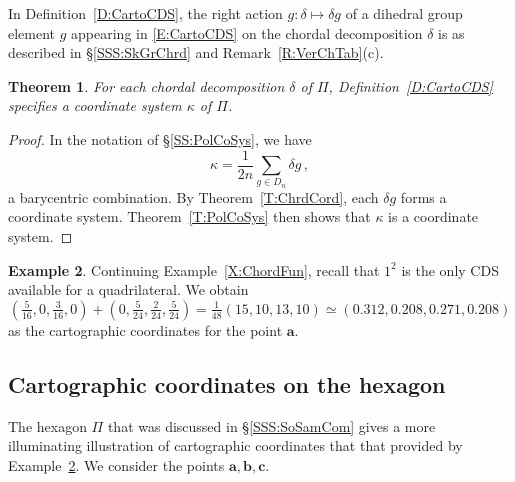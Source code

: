 \documentclass[12pt]{amsart}
\theoremstyle{plain}
\newtheorem{theorem}{Theorem}[section]
\theoremstyle{definition}
\newtheorem{example}[theorem]{Example}
\numberwithin{equation}{section}
\begin{document}
In Definition~\ref{D:CartoCDS}, the right action $g\colon\delta\mapsto\delta g$ of a dihedral group element $g$ appearing in \eqref{E:CartoCDS} on the chordal decomposition $\delta$ is as described in \S\ref{SSS:SkGrChrd} and Remark~\ref{R:VerChTab}(c).


\begin{theorem}\label{T:CartoCDS}
For each chordal decomposition $\delta$ of $\Pi$, Definition~\ref{D:CartoCDS} specifies a coordinate system $\kappa$ of $\Pi$.
\end{theorem}


\begin{proof}
In the notation of \S\ref{SS:PolCoSys}, we have
$$
\kappa=\frac1{2n}\sum_{g\in D_n}\delta g\,,
$$
a barycentric combination. By Theorem~\ref{T:ChrdCord}, each $\delta g$ forms a coordinate system. Theorem~\ref{T:PolCoSys} then shows that $\kappa$ is a coordinate system.
\end{proof}


\begin{example}\label{X:CartoCDS}
Continuing Example~\ref{X:ChordFun}, recall that $1^2$ is the only CDS available for a quadrilateral. We obtain
$$
\left(\tfrac5{16},0,\tfrac3{16},0\right)
+\left(0,\tfrac5{24},\tfrac2{24},\tfrac5{24}\right)
=\tfrac1{48}(15,10,13,10)
\simeq(0.312,0.208,0.271,0.208)
$$
as the cartographic coordinates for the point $\mathbf a$.
\end{example}



\subsection{Cartographic coordinates on the hexagon}\label{SSS:MoSamCom}


The hexagon $\Pi$ that was discussed in \S\ref{SSS:SoSamCom} gives a more illuminating illustration of cartographic coordinates that that provided by Example~\ref{X:CartoCDS}. We consider the points $\mathbf a,\mathbf b,\mathbf c$.
\end{document}
